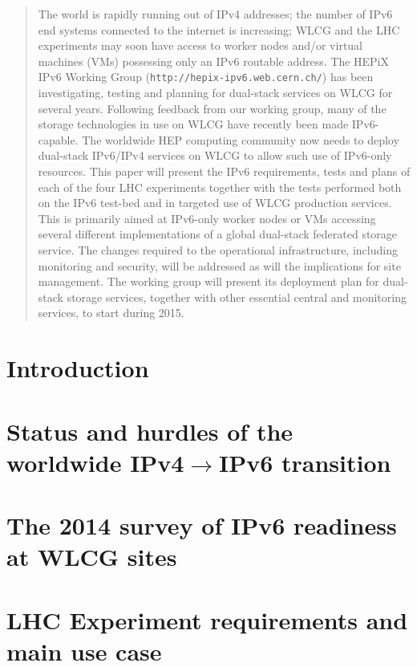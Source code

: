 \documentclass[a4paper]{jpconf}
\begin{document}
\begin{abstract}
The world is rapidly running out of IPv4 addresses; the number of IPv6 end systems connected
to the internet is increasing; WLCG and the LHC experiments may soon have access to worker
nodes and/or virtual machines (VMs) possessing only an IPv6 routable address. The HEPiX
IPv6 Working Group ({\tt http://hepix-ipv6.web.cern.ch/}) has been investigating, testing and
planning for dual-stack services on WLCG for several years. Following feedback from our
working group, many of the storage technologies in use on WLCG have recently been made
IPv6-capable. The worldwide HEP computing community now needs to deploy dual-stack
IPv6/IPv4 services on WLCG to allow such use of IPv6-only resources.
This paper will present the IPv6 requirements, tests and plans of each of the four LHC
experiments together with the tests performed both on the IPv6 test-bed and in targeted use
of WLCG production services. This is primarily aimed at IPv6-only worker nodes or VMs
accessing several different implementations of a global dual-stack federated storage service.
The changes required to the operational infrastructure, including monitoring and security, will
be addressed as will the implications for site management. The working group will present
its deployment plan for dual-stack storage services, together with other essential central and
monitoring services, to start during 2015.
\end{abstract}

\section{Introduction}


\section{Status and hurdles of the worldwide IPv4$\rightarrow$IPv6 transition}


\section{The 2014 survey of IPv6 readiness at WLCG sites}


\section{LHC Experiment requirements and main use case}

\end{document}
